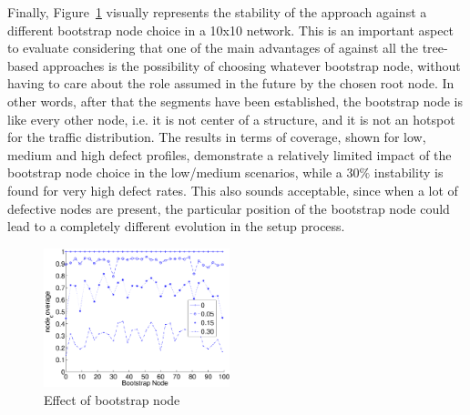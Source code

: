 Finally, Figure~\ref{fig:results_bootstrap} visually represents the
stability of the approach against a different bootstrap node choice
in a 10x10 network. This is an important aspect to evaluate 
considering that one of the main advantages of \disr{} against all the
tree-based approaches is the possibility of choosing whatever
bootstrap node, without having to care about the role assumed in the
future by the chosen root node. In other words, after that the segments have
been established, the bootstrap node is like every other node, i.e. it
is not center of a structure, and it is not an hotspot for the traffic
distribution. The results in terms of coverage, shown for low, medium
and high defect profiles, demonstrate a relatively limited
impact of the bootstrap node choice in the low/medium scenarios, while a
$30\%$ instability is found for very high defect rates. This also
sounds acceptable, since when a lot of defective nodes are present, the
particular position of the bootstrap node could lead to a completely
different evolution in the \disr{} setup process.

\begin{figure}
\centering
\includegraphics[width=0.48\textwidth]{pictures/set3.eps}
\caption{Effect of bootstrap node}
\label{fig:results_bootstrap}
\end{figure}

